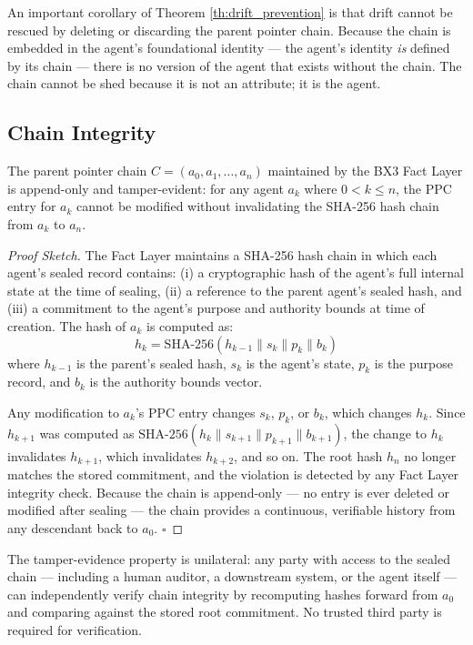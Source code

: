 An important corollary of Theorem \ref{th:drift_prevention} is that drift cannot be rescued by deleting or discarding the parent pointer chain. Because the chain is embedded in the agent's foundational identity — the agent's identity \emph{is} defined by its chain — there is no version of the agent that exists without the chain. The chain cannot be shed because it is not an attribute; it is the agent.

\subsection{Chain Integrity}

\begin{theorem}\label{th:chain_integrity}
The parent pointer chain $C = (a_0, a_1, \dots, a_n)$ maintained by the BX3 Fact Layer is append-only and tamper-evident: for any agent $a_k$ where $0 < k \leq n$, the PPC entry for $a_k$ cannot be modified without invalidating the SHA-256 hash chain from $a_k$ to $a_n$.
\end{theorem}

\begin{proof}[Proof Sketch]
The Fact Layer maintains a SHA-256 hash chain in which each agent's sealed record contains: (i) a cryptographic hash of the agent's full internal state at the time of sealing, (ii) a reference to the parent agent's sealed hash, and (iii) a commitment to the agent's purpose and authority bounds at time of creation. The hash of $a_k$ is computed as:
\[
h_k = \text{SHA-256}(h_{k-1} \parallel s_k \parallel p_k \parallel b_k)
\]
where $h_{k-1}$ is the parent's sealed hash, $s_k$ is the agent's state, $p_k$ is the purpose record, and $b_k$ is the authority bounds vector.

Any modification to $a_k$'s PPC entry changes $s_k$, $p_k$, or $b_k$, which changes $h_k$. Since $h_{k+1}$ was computed as $\text{SHA-256}(h_k \parallel s_{k+1} \parallel p_{k+1} \parallel b_{k+1})$, the change to $h_k$ invalidates $h_{k+1}$, which invalidates $h_{k+2}$, and so on. The root hash $h_n$ no longer matches the stored commitment, and the violation is detected by any Fact Layer integrity check. Because the chain is append-only — no entry is ever deleted or modified after sealing — the chain provides a continuous, verifiable history from any descendant back to $a_0$. $\square$
\end{proof}

The tamper-evidence property is unilateral: any party with access to the sealed chain — including a human auditor, a downstream system, or the agent itself — can independently verify chain integrity by recomputing hashes forward from $a_0$ and comparing against the stored root commitment. No trusted third party is required for verification.

